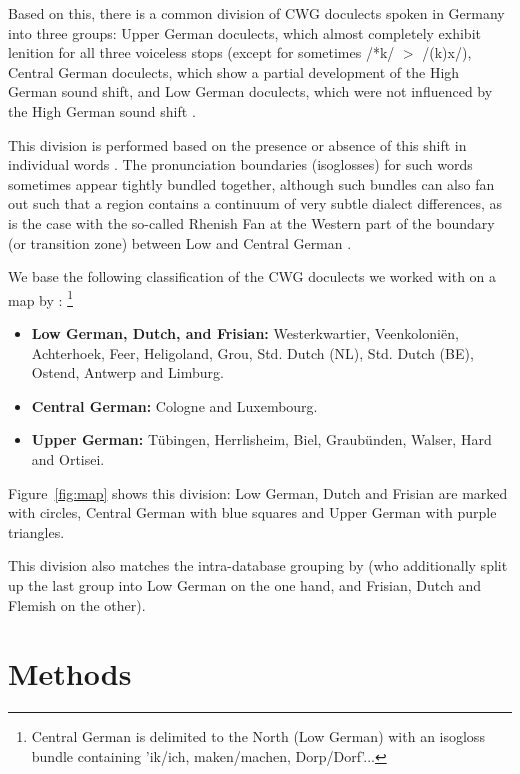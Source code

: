 \documentclass[a4paper]{article}
\begin{document}
Based on this, there is a common division
of CWG doculects spoken in Germany into three groups:
Upper German doculects, which almost completely
exhibit lenition for all three voiceless stops
(except for sometimes /*k/ $>$ /(k)x/),
Central German doculects, which show a
partial development of the High German sound shift,
and Low German doculects,
which were not influenced by the High German sound shift
\citep[pp. 33, 55]{noble1983modern}.

This division is performed based on
the presence or absence of this shift in individual words \citep[p. 63]{koenig2015dtv}.
The pronunciation boundaries (isoglosses) for such words
sometimes appear tightly bundled together,
although such bundles can also fan out such that a region
contains a continuum of very subtle dialect differences,
as is the case with the so-called Rhenish Fan at the Western part
of the boundary (or transition zone) between Low and Central German
\citep[pp. 63, 138, 141]{koenig2015dtv}.

We base the following classification of
the CWG doculects we worked with
on a map by \citet[pp. 230-231]{koenig2015dtv}:
\footnote{
Central German is delimited %
to the North (Low German) with an isogloss bundle containing
'ik/ich, maken/machen, Dorp/Dorf'...
}

\begin{itemize}
\item
\textbf{Low German, Dutch, and Frisian:}
Westerkwartier, Veenkoloni\"{e}n, Achterhoek,
Feer, Heligoland, Grou,
Std. Dutch (NL), Std. Dutch (BE), Ostend, Antwerp and Limburg.

\item
\textbf{Central German:}
Cologne and Luxembourg.

\item
\textbf{Upper German:}
T\"{u}bingen, Herrlisheim,
Biel, Graub\"{u}nden, Walser, Hard and Ortisei.
\end{itemize}

Figure~\ref{fig:map} shows this division:
Low German, Dutch and Frisian are marked with circles,
Central German with blue squares and Upper German with purple triangles.

This division also matches the intra-database grouping by \citet{heggarty2018sound}
(who additionally split up the last group into
Low German on the one hand,
and Frisian, Dutch and Flemish on the other).

\section{Methods}
\label{sec:methods}
\end{document}
